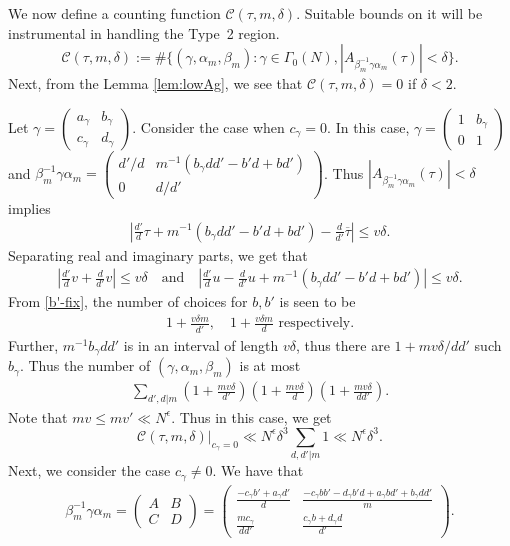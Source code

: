\documentclass[11pt]{amsart}
\numberwithin{equation}{section}
\theoremstyle{plain}
\theoremstyle{definition}
\newcommand{\mc}{\mathcal}
\newcommand{\q}{\quad}
\newcommand{\smat}[4]{\left( \begin{smallmatrix}#1&#2\\#3&#4\end{smallmatrix}\right)}
\begin{document}
We now define a counting function $\mc C(\tau, m, \delta)$. Suitable bounds on it will be instrumental in handling the Type~2 region.
\begin{equation}
    \mc C(\tau, m, \delta):= \#\{(\gamma, \alpha_m, \beta_m): \gamma\in \Gamma_0(N), |A_{\beta_m^{-1}\gamma\alpha_m}(\tau)|< \delta\}.
\end{equation}
Next, from the Lemma \ref{lem:lowAg}, we see that $\mc C(\tau, m, \delta)=0$ if $\delta< 2$.

Let $\gamma=\smat{a_\gamma}{b_\gamma}{c_\gamma}{d_\gamma}$. Consider the case when $c_\gamma=0$. In this case, $\gamma= \smat{1}{b_\gamma}{0}{1}$ and $\beta_m^{-1} \gamma \alpha_m =\smat{d'/d}{m^{-1}(b_\gamma dd'-b'd+bd')}{0}{d/d'}$. Thus $|A_{\beta_m^{-1}\gamma\alpha_m}(\tau)|< \delta$ implies
\begin{align}
    \left|\frac{d'}{d}\tau+ m^{-1}(b_\gamma dd'-b'd+bd')- \frac{d}{d'}\overline{\tau}\right| \le v\delta.
\end{align}
Separating real and imaginary parts, we get that
\begin{align} 
    |\frac{d'}{d}v+ \frac{d}{d'}v|\le v\delta\q \text{and}\q
    \left|\frac{d'}{d}u- \frac{d}{d'}u+ m^{-1}(b_\gamma dd'-b'd+bd')\right|\le v\delta. \label{b'-fix}
\end{align}
From \eqref{b'-fix}, the number of choices for $b,b'$ is seen to be 
\begin{align}
  1+ \frac{v \delta m}{d'}, \q   1+ \frac{v \delta m}{d} \text{ respectively.}
\end{align}
Further, $m^{-1}b_\gamma dd'$ is in an interval of length $v\delta$, thus there are $1+ mv\delta/dd'$ such $b_\gamma$. Thus the number of $(\gamma, \alpha_m, \beta_m)$ is at most
\begin{align}
    \sum_{d',d|m} (1+\frac{mv \delta }{d'} ) (1+ \frac{mv \delta }{d}) \left(1+ \frac{mv \delta }{dd'} \right) .
\end{align}
Note that $mv\le mv' \ll N^\epsilon$. Thus in this case, we get
\begin{equation}
    \mc C(\tau, m, \delta)|_{c_\gamma=0}\ll N^\epsilon \delta^3 \sum_{d,d'|m} 1 \ll N^\epsilon \delta^3.
\end{equation}
Next, we consider the case $c_\gamma\neq 0$. We have that
\begin{align} \label{g-def}
\beta_m^{-1}\gamma\alpha_m=\smat{A}{B}{C}{D} = \smat{\frac{-c_\gamma  b' + a_\gamma  d'}{d}}{\frac{-c_\gamma b b' - d_\gamma b' d + a_\gamma b d' + b_\gamma d d'}{m}}{\frac{mc_\gamma }{dd'}}{\frac{c_\gamma b + d_\gamma d}{d'}}.
\end{align}
\end{document}
